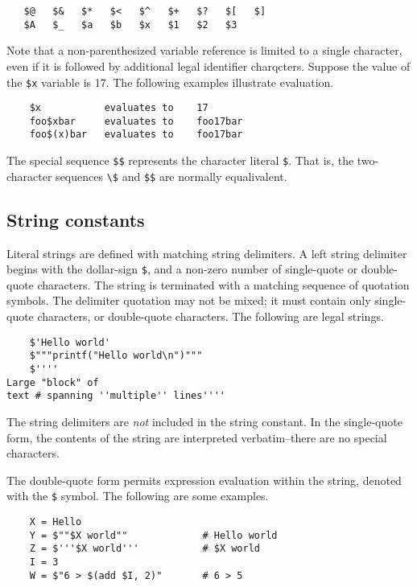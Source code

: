 \begin{verbatim}
   $@   $&   $*   $<   $^   $+   $?   $[   $]
   $A   $_   $a   $b   $x   $1   $2   $3
\end{verbatim}

Note that a non-parenthesized variable reference is limited to a single character, even if it is
followed by additional legal identifier charqcters.  Suppose the value of the \verb+$x+ variable is
17.  The following examples illustrate evaluation.

\begin{verbatim}
    $x           evaluates to    17
    foo$xbar     evaluates to    foo17bar
    foo$(x)bar   evaluates to    foo17bar
\end{verbatim}

The special sequence \verb+$$+ represents the character literal \verb+$+.  That is, the
two-character sequences \verb+\$+ and \verb+$$+ are normally equalivalent.

\subsection{String constants}
\label{section:quotes}

Literal strings are defined with matching string delimiters.  A left string delimiter begins with
the dollar-sign \verb+$+, and a non-zero number of single-quote or double-quote characters.  The
string is terminated with a matching sequence of quotation symbols.  The delimiter quotation may not
be mixed; it must contain only single-quote characters, or double-quote characters.  The following
are legal strings.

\begin{verbatim}
    $'Hello world'
    $"""printf("Hello world\n")"""
    $''''
Large "block" of
text # spanning ''multiple'' lines''''
\end{verbatim}

The string delimiters are \emph{not} included in the string constant.  In the single-quote form,
the contents of the string are interpreted verbatim--there are no special characters.

The double-quote form permits expression evaluation within the string, denoted with the \verb+$+ symbol.
The following are some examples.

\begin{verbatim}
    X = Hello
    Y = $""$X world""             # Hello world
    Z = $'''$X world'''           # $X world
    I = 3
    W = $"6 > $(add $I, 2)"       # 6 > 5
\end{verbatim}

